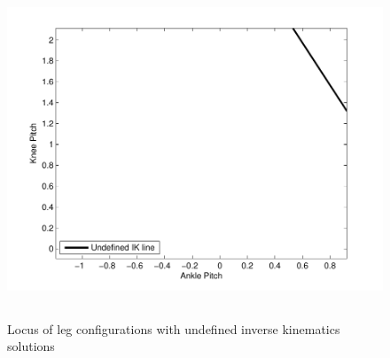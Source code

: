 \begin{figure}[!h]
	\begin{center}
		\includegraphics[height = 10cm]{Figures/locus.pdf}
 		\caption{Locus of leg configurations with undefined inverse kinematics solutions}
 		\label{fig:unlocus}
	\end{center}
\end{figure}

